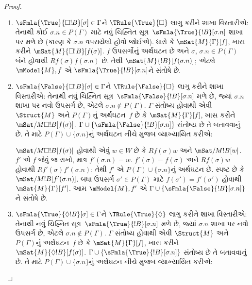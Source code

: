 \begin{proof}
\begin{enumerate}
%
\item $\sFmla{\True}{\Box !B}[\sigma] \in \Gamma$ને
  $\TRule{\True}{\Box}$ લાગુ કરીને શાખા વિસ્તારીએ:
  તેનાથી કોઈ
    $\sigma.n \in P(\Gamma)$ માટે નવું ચિહ્નિત સૂત્ર~$\sFmla{\True}{!B}[\sigma.n]$ શાખા પર મળે છે
    (કારણ કે $\sigma.n$ વપરાયેલો હોવો જોઈએ). ધારો કે
    $\mSat{M}{\Gamma}[f]$, ખાસ કરીને
    $\mSat{M}{\Box !B}[f(\sigma)]$. $f$ ઉપસર્ગોનું અર્થઘટન છે
    અને $\sigma$, $\sigma.n \in P(\Gamma)$ બંને હોવાથી
    $Rf(\sigma)f(\sigma.n)$ છે. તેથી
    $\mSat{M}{!B}[f(\sigma.n)]$; એટલે $\mModel{M}, f$ એ
    $\sFmla{\True}{!B}[\sigma.n]$ને સંતોષે છે.

\item $\sFmla{\False}{\Box !B}[\sigma] \in \Gamma$ને
  $\TRule{\False}{\Box}$ લાગુ કરીને શાખા વિસ્તારીએ:
  તેનાથી નવું ચિહ્નિત સૂત્ર~$\sFmla{\False}{!B}[\sigma.n]$ મળે છે, જ્યાં
    $\sigma.n$ શાખા પર નવો ઉપસર્ગ છે, એટલે
    $\sigma.n \notin P(\Gamma)$.
    $\Gamma$ સંતોષ્ય હોવાથી એવી $\Struct{M}$ અને
    $P(\Gamma)$નું અર્થઘટન~$f$ છે કે
    $\mSat{M}{\Gamma}[f]$, ખાસ કરીને
    $\mSat/{M}{\Box !B}[f(\sigma)]$.
    $\Gamma \cup \{\sFmla{\False}{!B}[\sigma.n]\}$ સંતોષ્ય છે
    તે બતાવવાનું છે. તે માટે $P(\Gamma)
    \cup \{\sigma.n\}$નું અર્થઘટન નીચે મુજબ વ્યાખ્યાયિત કરીએ:

  $\mSat/{M}{\Box !B}[f(\sigma)]$ હોવાથી એવું $w \in W$ છે કે
  $Rf(\sigma)w$ અને $\mSat/{M}{!B}[w]$. $f'$ એ $f$ જેવું જ
  રાખો, માત્ર $f'(\sigma.n) = w$. $f'(\sigma) = f(\sigma)$
  અને $Rf(\sigma)w$ હોવાથી $Rf'(\sigma)f'(\sigma.n)$;
  તેથી $f'$ એ $P(\Gamma) \cup \{\sigma.n\}$નું અર્થઘટન છે.
  સ્પષ્ટ છે કે $\mSat/{M}{!B}[f'(\sigma.n)]$.
  બધા ઉપસર્ગ $\sigma' \in P(\Gamma)$ માટે
  $f(\sigma') = f'(\sigma')$ હોવાથી $\mSat{M}{\Gamma}[f']$.
  આમ $\mModel{M}, f'$ એ $\Gamma \cup
  \{\sFmla{\False}{!B}[\sigma.n]\}$ને સંતોષે છે.

%
\item $\sFmla{\True}{\Diamond !B}[\sigma] \in \Gamma$ને
  $\TRule{\True}{\Diamond}$ લાગુ કરીને શાખા વિસ્તારીએ:
  તેનાથી નવું ચિહ્નિત સૂત્ર~$\sFmla{\True}{!B}[\sigma.n]$ મળે છે, જ્યાં
    $\sigma.n$ શાખા પર નવો ઉપસર્ગ છે, એટલે
    $\sigma.n \notin P(\Gamma)$.
    $\Gamma$ સંતોષ્ય હોવાથી એવી $\Struct{M}$ અને
    $P(\Gamma)$નું અર્થઘટન~$f$ છે કે
    $\mSat{M}{\Gamma}[f]$, ખાસ કરીને
    $\mSat{M}{\Diamond !B}[f(\sigma)]$.
    $\Gamma \cup \{\sFmla{\True}{!B}[\sigma.n]\}$ સંતોષ્ય છે
    તે બતાવવાનું છે. તે માટે $P(\Gamma)
    \cup \{\sigma.n\}$નું અર્થઘટન નીચે મુજબ વ્યાખ્યાયિત કરીએ:


\end{enumerate}
\end{proof}
